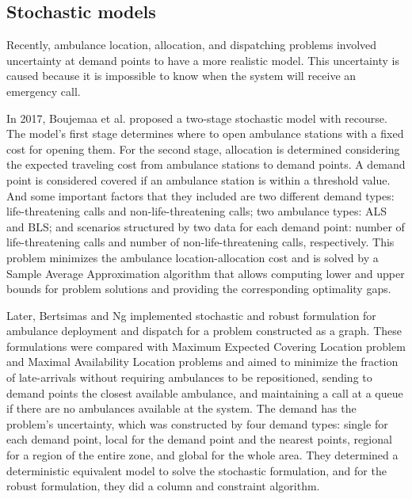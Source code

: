 \subsection{Stochastic models}

Recently, ambulance location, allocation, and dispatching problems involved un\-cer\-tain\-ty at demand points to have a more realistic model. This uncertainty is cau\-sed because it is impossible to know when the system will receive an emergency call.

In 2017, Boujemaa et al. \citep{boujemaa2018stochastic} proposed a two-stage stochastic model with recourse. The model's first stage determines where to open ambulance stations with a fixed cost for opening them. For the second stage, allocation is determined considering the expected traveling cost from ambulance stations to de\-mand points. A demand point is considered covered if an ambulance station is within a threshold value. And some important factors that they included are two different demand types: life-threatening calls and non-life-threatening calls; two ambulance types: ALS and BLS; and scenarios structured by two data for each demand point: number of life-threatening calls and number of non-life-threatening calls, respectively. This problem minimizes the ambulance location-allocation cost and is solved by a Sample Average Approximation algorithm that allows computing lower and upper bounds for problem solutions and providing the corresponding optimality gaps.

Later, Bertsimas and Ng \cite{bertsimas2019robust} implemented stochastic and robust formulation for ambulance deployment and dispatch for a problem constructed as a graph. These formulations were compared with Maximum Expected Covering Location problem and Maximal Availability Location problems and aimed to minimize the fraction of late-arrivals without requiring ambulances to be repositioned, sending to demand points the closest available ambulance, and maintaining a call at a queue if there are no ambulances available at the system. The demand has the problem's uncertainty, which was constructed by four demand types: single for each demand point, local for the demand point and the nearest points, regional for a region of the entire zone, and global for the whole area. They determined a deterministic equivalent model to solve the stochastic formulation, and for the robust formulation, they did a column and constraint algorithm.  

